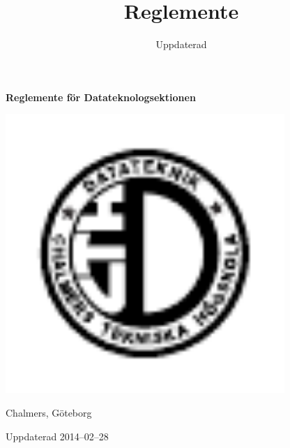 \documentclass{dtek}
\title{Reglemente}
\date{Uppdaterad \updated}
\newcommand{\updated}{2014--02--28}
\begin{document}
\makeheadfoot%

\vspace*{\fill}
\begin{center}
  {\Huge \textbf{Reglemente för Datateknologsektionen}}
  
  \includegraphics[width=300pt]{Datalogo.pdf}
  
  {\LARGE Chalmers, Göteborg}

  \vspace{2cm}

  {\LARGE Uppdaterad \updated}
\end{center}
\vfill

\newpage

\setcounter{tocdepth}{2}
\tableofcontents

\newpage

\end{document}
